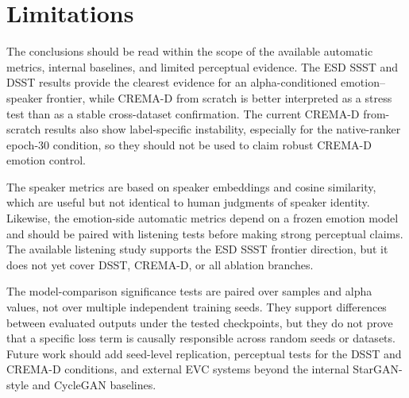 \section{Limitations}
\label{sec:limitations}

The conclusions should be read within the scope of the available automatic metrics, internal baselines, and limited perceptual evidence.
The ESD SSST and DSST results provide the clearest evidence for an alpha-conditioned emotion--speaker frontier, while CREMA-D from scratch is better interpreted as a stress test than as a stable cross-dataset confirmation.
The current CREMA-D from-scratch results also show label-specific instability, especially for the native-ranker epoch-30 condition, so they should not be used to claim robust CREMA-D emotion control.

The speaker metrics are based on speaker embeddings and cosine similarity, which are useful but not identical to human judgments of speaker identity.
Likewise, the emotion-side automatic metrics depend on a frozen emotion model and should be paired with listening tests before making strong perceptual claims.
The available listening study supports the ESD SSST frontier direction, but it does not yet cover DSST, CREMA-D, or all ablation branches.

The model-comparison significance tests are paired over samples and alpha values, not over multiple independent training seeds.
They support differences between evaluated outputs under the tested checkpoints, but they do not prove that a specific loss term is causally responsible across random seeds or datasets.
Future work should add seed-level replication, perceptual tests for the DSST and CREMA-D conditions, and external EVC systems beyond the internal StarGAN-style and CycleGAN baselines.
